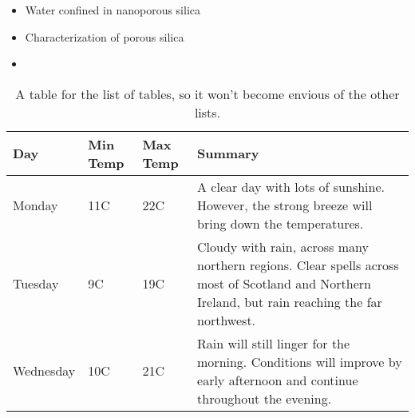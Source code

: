 \begin{itemize}
    \item Water confined in nanoporous silica
    \item Characterization of porous silica
    \item 
\end{itemize}

\begin{center}
\begin{table}
    \begin{tabular}{ | l | l | l | p{5cm} |}
    \hline
    Day & Min Temp & Max Temp & Summary \\ \hline
    Monday & 11C & 22C & A clear day with lots of sunshine.  
    However, the strong breeze will bring down the temperatures. \\ \hline
    Tuesday & 9C & 19C & Cloudy with rain, across many northern regions. Clear spells
    across most of Scotland and Northern Ireland,
    but rain reaching the far northwest. \\ \hline
    Wednesday & 10C & 21C & Rain will still linger for the morning.
    Conditions will improve by early afternoon and continue
    throughout the evening. \\
    \hline
    \end{tabular}
\caption{A table for the list of tables, so it won't become envious of the other lists.}
\end{table}
\end{center}
